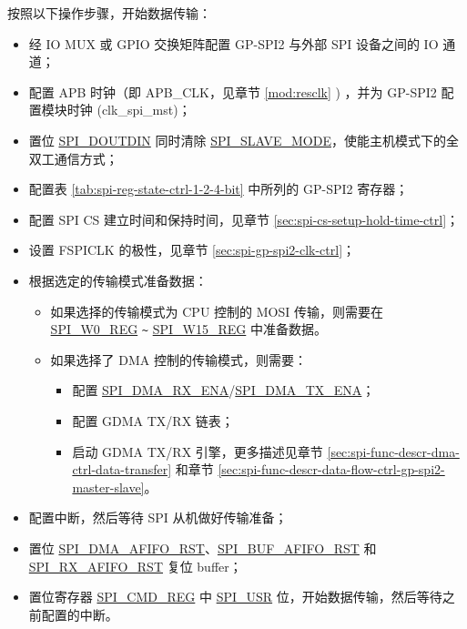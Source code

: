 \documentclass[main\_\_CN.tex]{subfiles}
\begin{document}
按照以下操作步骤，开始数据传输：
\begin{itemize}
    \item 经 IO MUX 或 GPIO 交换矩阵配置 GP-SPI2 与外部 SPI 设备之间的 IO 通道；
    \item 配置 APB 时钟（即 APB\_CLK，见章节  \ref{mod:resclk} \textit{}) ，并为 GP-SPI2 配置模块时钟 (clk\_spi\_mst)；
    \item 置位 \hyperref[fielddesc:SPIDOUTDIN]{SPI\_DOUTDIN} 同时清除 \hyperref[fielddesc:SPISLAVEMODE]{SPI\_SLAVE\_MODE}，使能主机模式下的全双工通信方式；

    \item 配置表  \ref{tab:spi-reg-state-ctrl-1-2-4-bit} 中所列的 GP-SPI2 寄存器；

    \item 配置 SPI CS 建立时间和保持时间，见章节  \ref{sec:spi-cs-setup-hold-time-ctrl}；

    \item 设置 FSPICLK 的极性，见章节  \ref{sec:spi-gp-spi2-clk-ctrl}；

    \item 根据选定的传输模式准备数据：
    \begin{itemize}
        \item 如果选择的传输模式为 CPU 控制的 MOSI 传输，则需要在 \hyperref[regdesc:SPIW0REG]{SPI\_W0\_REG} \verb+~+ \hyperref[regdesc:SPIW15REG]{SPI\_W15\_REG} 中准备数据。

        \item 如果选择了 DMA 控制的传输模式，则需要：
        \begin{itemize}
            \item 配置 \hyperref[fielddesc:SPIDMARXENA]{SPI\_DMA\_RX\_ENA}/\hyperref[fielddesc:SPIDMATXENA]{SPI\_DMA\_TX\_ENA}；
            \item 配置 GDMA TX/RX 链表；
            \item 启动 GDMA TX/RX 引擎，更多描述见章节  \ref{sec:spi-func-descr-dma-ctrl-data-transfer} 和章节  \ref{sec:spi-func-descr-data-flow-ctrl-gp-spi2-master-slave}。
        \end{itemize}
    \end{itemize}

    \item 配置中断，然后等待 SPI 从机做好传输准备；

    \item 置位 \hyperref[fielddesc:SPIDMAAFIFORST]{SPI\_DMA\_AFIFO\_RST}、\hyperref[fielddesc:SPIBUFAFIFORST]{SPI\_BUF\_AFIFO\_RST} 和 \hyperref[fielddesc:SPIRXAFIFORST]{SPI\_RX\_AFIFO\_RST} 复位 buffer；

    \item 置位寄存器 \hyperref[regdesc:SPICMDREG]{SPI\_CMD\_REG} 中 \hyperref[fielddesc:SPIUSR]{SPI\_USR} 位，开始数据传输，然后等待之前配置的中断。

\end{itemize}
\end{document}
